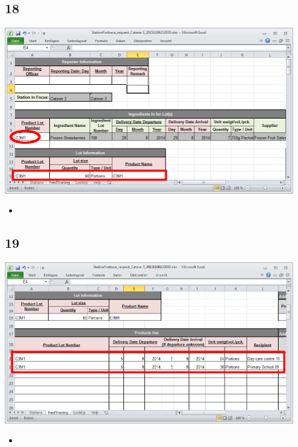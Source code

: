 \documentclass{beamer}
\begin{document}
\subsection{18}
\begin{frame}
	\begin{center}
  		\includegraphics[width=0.95\textwidth]{18.png}
	\end{center}
	\begin{itemize}
		\item
	\end{itemize}
\end{frame}

\subsection{19}
\begin{frame}
	\begin{center}
  		\includegraphics[width=0.95\textwidth]{19.png}
	\end{center}
	\begin{itemize}
		\item
	\end{itemize}
\end{frame}
\end{document}
